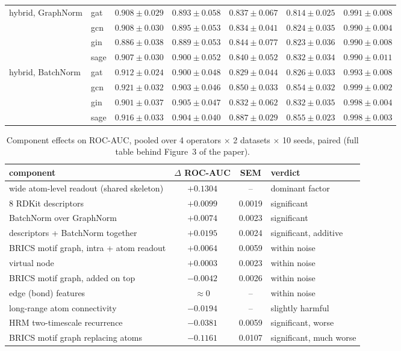 \documentclass[10pt,letterpaper]{article}
\begin{document}
\begin{table}[!htbp]
{\begin{tabular}{@{}llccccc@{}}
\midrule
hybrid, GraphNorm & gat & $0.908\pm0.029$ & $0.893\pm0.058$ & $0.837\pm0.067$ & $0.814\pm0.025$ & $0.991\pm0.008$\\
 & gcn & $0.908\pm0.030$ & $0.895\pm0.053$ & $0.834\pm0.041$ & $0.824\pm0.035$ & $0.990\pm0.004$\\
 & gin & $0.886\pm0.038$ & $0.889\pm0.053$ & $0.844\pm0.077$ & $0.823\pm0.036$ & $0.990\pm0.008$\\
 & sage & $0.907\pm0.030$ & $0.900\pm0.052$ & $0.840\pm0.052$ & $0.832\pm0.034$ & $0.990\pm0.011$\\
\midrule
hybrid, BatchNorm & gat & $0.912\pm0.024$ & $0.900\pm0.048$ & $0.829\pm0.044$ & $0.826\pm0.033$ & $0.993\pm0.008$\\
 & gcn & $0.921\pm0.032$ & $0.903\pm0.046$ & $0.850\pm0.033$ & $0.854\pm0.032$ & $0.999\pm0.002$\\
 & gin & $0.901\pm0.037$ & $0.905\pm0.047$ & $0.832\pm0.062$ & $0.832\pm0.035$ & $0.998\pm0.004$\\
 & sage & $0.916\pm0.033$ & $0.904\pm0.040$ & $0.887\pm0.029$ & $0.855\pm0.023$ & $0.998\pm0.003$\\
\bottomrule\end{tabular}}
\end{table}

\begin{table}[!htbp]\centering
\caption{Component effects on ROC-AUC, pooled over 4 operators $\times$ 2 datasets $\times$ 10 seeds, paired (full table behind Figure~3 of the paper).}
\label{tab:s2}
\begin{tabular}{@{}lccl@{}}\toprule
component & $\Delta$ ROC-AUC & SEM & verdict\\\midrule
wide atom-level readout (shared skeleton) & $+0.1304$ & -- & dominant factor\\
8 RDKit descriptors & $+0.0099$ & 0.0019 & significant\\
BatchNorm over GraphNorm & $+0.0074$ & 0.0023 & significant\\
descriptors + BatchNorm together & $+0.0195$ & 0.0024 & significant, additive\\
BRICS motif graph, intra + atom readout & $+0.0064$ & 0.0059 & within noise\\
virtual node & $+0.0003$ & 0.0023 & within noise\\
BRICS motif graph, added on top & $-0.0042$ & 0.0026 & within noise\\
edge (bond) features & $\approx0$ & -- & within noise\\
long-range atom connectivity & $-0.0194$ & -- & slightly harmful\\
HRM two-timescale recurrence & $-0.0381$ & 0.0059 & significant, worse\\
BRICS motif graph replacing atoms & $-0.1161$ & 0.0107 & significant, much worse\\\bottomrule
\end{tabular}
\end{table}
\end{document}

